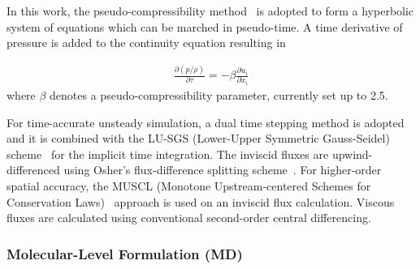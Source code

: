 \documentclass[preprint,12pt]{elsarticle}
\begin{document}
In this work, the pseudo-compressibility method~\cite{PseudoCompressibility} is adopted to form a hyperbolic system of equations which can be marched in pseudo-time.
A time derivative of pressure is added to the continuity equation resulting in

\vspace{-.2em}
\begin{eqnarray}
\frac{\partial (p/\rho)}{\partial \tau} = - \beta \frac{\partial {u}_{i}}{\partial {x}_{i}}
\end{eqnarray}
where $\beta$ denotes a pseudo-compressibility parameter, currently set up to 2.5.

For time-accurate unsteady simulation, a dual time stepping method is adopted and it is combined with the LU-SGS (Lower-Upper Symmetric Gauss-Seidel) scheme~\cite{LU-SGS} for the implicit time integration. The inviscid fluxes are upwind-differenced using Osher's flux-difference splitting scheme~\cite{Osher}. For higher-order spatial accuracy, the MUSCL (Monotone Upstream-centered Schemes for Conservation Laws)~\cite{MUSCL} approach is used on an inviscid flux calculation. Viscous fluxes are calculated using conventional second-order central differencing.


\subsubsection{Molecular-Level Formulation (MD)}
\label{sec:numerical_MDschemes}



\end{document}
